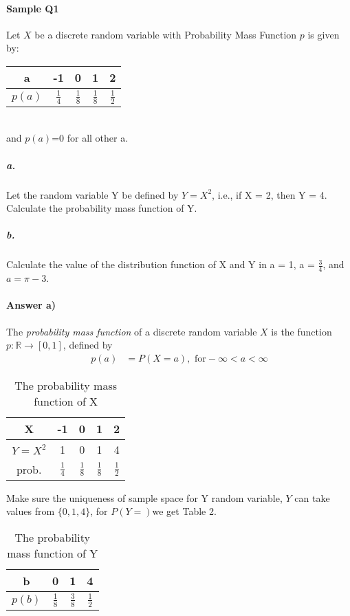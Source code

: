 \documentclass[11pt]{article} %
\begin{document}
\paragraph*{\bf Sample Q1} Let $X$ be a discrete random variable with Probability Mass Function $p$ is given by: \\
\begin{table}[h!]
\begin{center}
\begin{tabular}{c|cccc} \hline
a & -1 & 0 & 1 & 2 \\ \hline
$p(a)$ & $\frac{1}{4}$ & $\frac{1}{8}$ & $\frac{1}{8}$ & $\frac{1}{2}$ \\ \hline
\end{tabular}
\label{ta1}
\end{center}
\end{table}
\\ and $p(a)$=0 for all other a. 

\subparagraph*{a.} Let the random variable Y be defined by $Y=X^2$, i.e., if X = 2, then Y = 4. Calculate the probability mass function of Y. 
\subparagraph*{b.} Calculate the value of the distribution function of X and Y in a = 1, a = $\frac{3}{4}$, and $a=\pi - 3$. 

\paragraph*{\bf Answer a)}The {\em probability mass function} of a discrete random variable $X$ is the function $p: \mathbb{R} \rightarrow [0, 1]$, defined by
\begin{align*}
p(a) & = P(X=a), \text{ for}  -\infty < a < \infty
\end{align*} 

\begin{table}[h!]
\begin{center}
\begin{tabular}{c|cccc} \hline
X & -1 & 0 & 1 & 2 \\ \hline
$Y=X^2$ & 1 & 0 & 1 & 4 \\ \hline
prob. & $\frac{1}{4}$ & $\frac{1}{8}$ & $\frac{1}{8}$ & $\frac{1}{2}$ \\ \hline
\end{tabular}
\caption{The probability mass function of X}
\label{ta1}
\end{center}
\end{table}

Make sure the uniqueness of sample space for Y random variable, $Y$ can take values from $\{0,1,4\}$, for $P(Y=)$we get Table 2. 
\begin{table}[h!]
\begin{center}
\begin{tabular}{c|ccc} \hline
b & 0 & 1 & 4 \\ \hline
$p(b)$ & $\frac{1}{8}$ & $\frac{3}{8}$ & $\frac{1}{2}$ \\ \hline
\end{tabular}
\caption{The probability mass function of Y}
\label{ta1}
\end{center}
\end{table}
\end{document}
